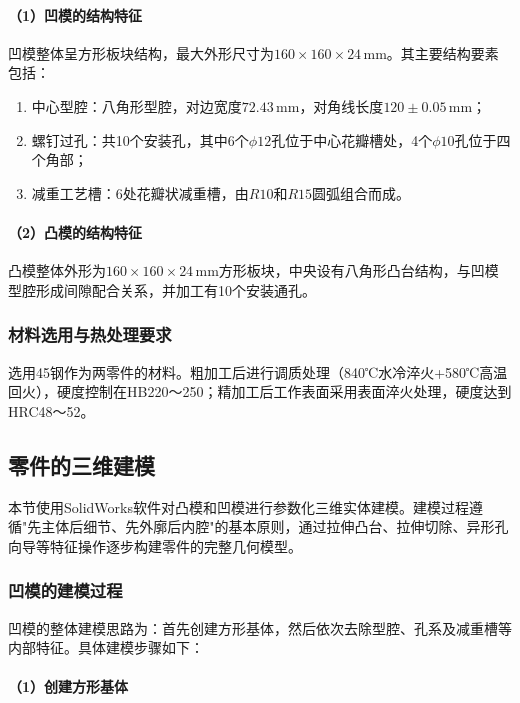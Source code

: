 \documentclass{xautCADreport}
\begin{document}
\paragraph{（1）凹模的结构特征}

凹模整体呈方形板块结构，最大外形尺寸为$160\times160\times24\,\mathrm{mm}$。其主要结构要素包括：
\begin{enumerate}
  \item 中心型腔：八角形型腔，对边宽度$72.43\,\mathrm{mm}$，对角线长度$120\pm0.05\,\mathrm{mm}$；
  \item 螺钉过孔：共10个安装孔，其中6个$\phi12$孔位于中心花瓣槽处，4个$\phi10$孔位于四个角部；
  \item 减重工艺槽：6处花瓣状减重槽，由$R10$和$R15$圆弧组合而成。
\end{enumerate}

\paragraph{（2）凸模的结构特征}

凸模整体外形为$160\times160\times24\,\mathrm{mm}$方形板块，中央设有八角形凸台结构，与凹模型腔形成间隙配合关系，并加工有10个安装通孔。

\subsubsection{材料选用与热处理要求}

选用45钢作为两零件的材料。粗加工后进行调质处理（840℃水冷淬火+580℃高温回火），硬度控制在HB220～250；精加工后工作表面采用表面淬火处理，硬度达到HRC48～52。

\subsection{零件的三维建模}

本节使用SolidWorks软件对凸模和凹模进行参数化三维实体建模。建模过程遵循"先主体后细节、先外廓后内腔"的基本原则，通过拉伸凸台、拉伸切除、异形孔向导等特征操作逐步构建零件的完整几何模型。

\subsubsection{凹模的建模过程}

凹模的整体建模思路为：首先创建方形基体，然后依次去除型腔、孔系及减重槽等内部特征。具体建模步骤如下：

\paragraph{（1）创建方形基体}
\end{document}
